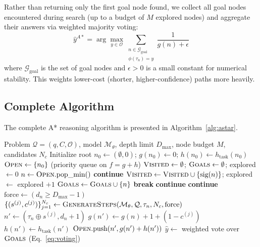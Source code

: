 \documentclass[11pt]{article}
\begin{document}
Rather than returning only the first goal node found, we collect all goal nodes encountered during search (up to a budget of $M$ explored nodes) and aggregate their answers via weighted majority voting:
\begin{equation}
\hat{y}^{A*} = \arg\max_{y \in \mathcal{O}} \sum_{\substack{n \in \mathcal{G}_{\text{goal}} \\ \phi(\tau_n) = y}} \frac{1}{g(n) + \epsilon}
\label{eq:voting}
\end{equation}
where $\mathcal{G}_{\text{goal}}$ is the set of goal nodes and $\epsilon > 0$ is a small constant for numerical stability. This weights lower-cost (shorter, higher-confidence) paths more heavily.

\subsection{Complete Algorithm}

The complete A* reasoning algorithm is presented in Algorithm~\ref{alg:astar}.

\begin{algorithm}[t]
\caption{A* Search over Reasoning Traces}
\label{alg:astar}
\begin{algorithmic}[1]
\REQUIRE Problem $\mathcal{Q} = (q, C, \mathcal{O})$, model $\mathcal{M}_\theta$, depth limit $D_{\max}$, node budget $M$, candidates $N_c$
\STATE Initialize root $n_0 \gets (\emptyset, 0)$; $g(n_0) \gets 0$; $h(n_0) \gets h_{\text{task}}(n_0)$
\STATE $\textsc{Open} \gets \{n_0\}$ (priority queue on $f = g + h$)
\STATE $\textsc{Visited} \gets \emptyset$; $\textsc{Goals} \gets \emptyset$; explored $\gets 0$
    \STATE $n \gets \textsc{Open}.\text{pop\_min}()$
        \STATE \textbf{continue}
    \ENDIF
    \STATE $\textsc{Visited} \gets \textsc{Visited} \cup \{\text{sig}(n)\}$; explored $\gets$ explored $+ 1$
        \STATE $\textsc{Goals} \gets \textsc{Goals} \cup \{n\}$
            \STATE \textbf{break} 
        \ENDIF
        \STATE \textbf{continue}
    \ENDIF
        \STATE \textbf{continue}
    \ENDIF
    \STATE $\text{force} \gets (d_n \geq D_{\max} - 1)$
    \STATE $\{(s^{(j)}, c^{(j)})\}_{j=1}^{N_c} \gets \textsc{GenerateSteps}(\mathcal{M}_\theta, \mathcal{Q}, \tau_n, N_c, \text{force})$
        \STATE $n' \gets (\tau_n \oplus s^{(j)}, d_n + 1)$
        \STATE $g(n') \gets g(n) + 1 + (1 - c^{(j)})$
        \STATE $h(n') \gets h_{\text{task}}(n')$
        \STATE $\textsc{Open}.\text{push}(n', g(n') + h(n'))$
    \ENDFOR
\ENDWHILE
\RETURN $\hat{y} \gets$ weighted vote over $\textsc{Goals}$ (Eq.~\ref{eq:voting})
\end{algorithmic}
\end{algorithm}
\end{document}

